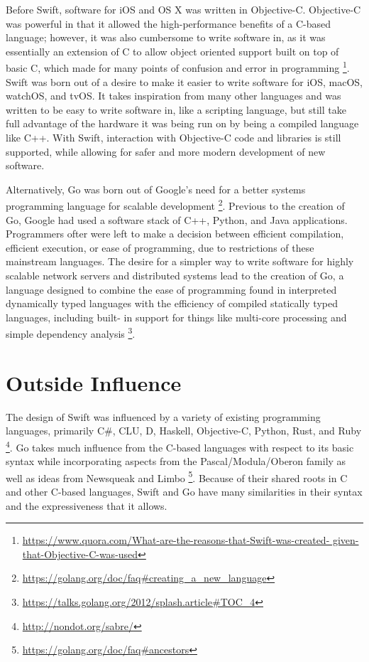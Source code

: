 \documentclass[letterpaper]{article}
\begin{document}
Before Swift, software for iOS and OS X was written in Objective-C. Objective-C was powerful in that it allowed the high-performance benefits of a C-based language; however, it was also cumbersome to write software in, as it was essentially an extension of C to allow object oriented support built on top of basic C, which made for many points of confusion and error in programming \footnote{\url{https://www.quora.com/What-are-the-reasons-that-Swift-was-created-
given-that-Objective-C-was-used}}. Swift was born out of a desire to make it easier to write software for iOS, macOS, watchOS, and tvOS. It takes inspiration from many other languages and was written to be easy to write software in, like a scripting language, but still take full advantage of the hardware it was being run on by being a compiled language like C++. With Swift, interaction with Objective-C code and libraries is still supported, while allowing for safer and more modern development of new software.

Alternatively, Go was born out of Google's need for a better systems programming language for scalable development \footnote{\url{https://golang.org/doc/faq#creating_a_new_language}}. Previous to the creation of Go, Google had used a software stack of C++, Python, and Java applications. Programmers ofter were left to make a decision between efficient compilation, efficient execution, or ease of programming, due to restrictions of these mainstream languages. The desire for a simpler way to write software for highly scalable network servers and distributed systems lead to the creation of Go, a language designed to combine the ease of programming found in interpreted dynamically typed languages with the efficiency of compiled statically typed languages, including built- in support for things like multi-core processing and simple dependency analysis \footnote{\url{https://talks.golang.org/2012/splash.article#TOC_4}}.

\section{Outside Influence}

The design of Swift was influenced by a variety of existing programming languages, primarily C\#, CLU, D, Haskell, Objective-C, Python, Rust, and Ruby \footnote{\url{http://nondot.org/sabre/}}. Go takes much influence from the C-based languages with respect to its basic syntax while incorporating aspects from the Pascal/Modula/Oberon family as well as ideas from Newsqueak and Limbo \footnote{\url{https://golang.org/doc/faq#ancestors}}. Because of their shared roots in C and other C-based languages, Swift and Go have many similarities in their syntax and the expressiveness that it allows.
\end{document}
